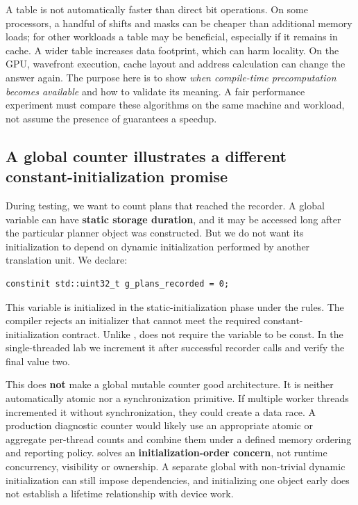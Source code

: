 A table is not automatically faster than direct bit operations. On some processors, a handful of shifts and masks can be cheaper than additional memory loads; for other workloads a table may be beneficial, especially if it remains in cache. A wider table increases data footprint, which can harm locality. On the GPU, wavefront execution, cache layout and address calculation can change the answer again. The purpose here is to show \emph{when compile-time precomputation becomes available} and how to validate its meaning. A fair performance experiment must compare these algorithms on the same machine and workload, not assume the presence of  guarantees a speedup.

\subsection{A global counter illustrates a different constant-initialization promise}\label{01-foundations-i-ch005-a-global-counter-illustrates-a-different-constant-initialization-promise}

\hypertarget{01-foundations-i-ch005-a-global-counter-illustrates-a-different-constant-initialization-promise}{}

During testing, we want to count plans that reached the recorder. A global variable can have \textbf{static storage duration}, and it may be accessed long after the particular planner object was constructed. But we do not want its initialization to depend on dynamic initialization performed by another translation unit. We declare:

\begin{verbatim}
constinit std::uint32_t g_plans_recorded = 0;
\end{verbatim}

This variable is initialized in the static-initialization phase under the  rules. The compiler rejects an initializer that cannot meet the required constant-initialization contract. Unlike ,  does not require the variable to be const. In the single-threaded lab we increment it after successful recorder calls and verify the final value two.

This does \textbf{not} make a global mutable counter good architecture. It is neither automatically atomic nor a synchronization primitive. If multiple worker threads incremented it without synchronization, they could create a data race. A production diagnostic counter would likely use an appropriate atomic or aggregate per-thread counts and combine them under a defined memory ordering and reporting policy.  solves an \textbf{initialization-order concern}, not runtime concurrency, visibility or ownership. A separate global with non-trivial dynamic initialization can still impose dependencies, and initializing one object early does not establish a lifetime relationship with device work.


